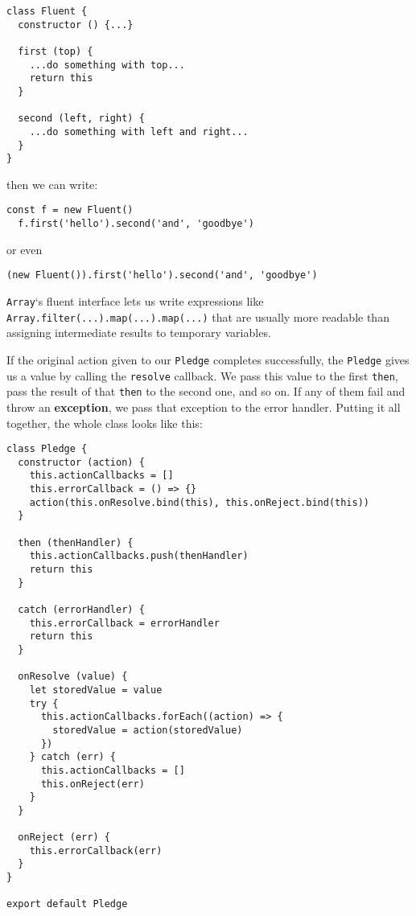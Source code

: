 \documentclass[krantzl]{krantz}
\newcommand{\glossref}[1]{\textbf{#1}}
\begin{document}
\begin{lstlisting}[frame=tblr]
class Fluent {
  constructor () {...}

  first (top) {
    ...do something with top...
    return this
  }

  second (left, right) {
    ...do something with left and right...
  }
}
\end{lstlisting}


\noindent then we can write:

\begin{lstlisting}[frame=tblr]
  const f = new Fluent()
  f.first('hello').second('and', 'goodbye')
\end{lstlisting}


\noindent or even

\begin{lstlisting}[frame=tblr]
  (new Fluent()).first('hello').second('and', 'goodbye')
\end{lstlisting}


\texttt{Array}‘s fluent interface lets us write expressions like
\texttt{Array.filter(...).map(...).map(...)}
that are usually more readable than assigning intermediate results to temporary variables.


If the original action given to our \texttt{Pledge} completes successfully,
the \texttt{Pledge} gives us a value by calling the \texttt{resolve} callback.
We pass this value to the first \texttt{then},
pass the result of that \texttt{then} to the second one,
and so on.
If any of them fail and throw an \glossref{exception},
we pass that exception to the error handler.
Putting it all together,
the whole class looks like this:


\begin{lstlisting}[frame=tblr]
class Pledge {
  constructor (action) {
    this.actionCallbacks = []
    this.errorCallback = () => {}
    action(this.onResolve.bind(this), this.onReject.bind(this))
  }

  then (thenHandler) {
    this.actionCallbacks.push(thenHandler)
    return this
  }

  catch (errorHandler) {
    this.errorCallback = errorHandler
    return this
  }

  onResolve (value) {
    let storedValue = value
    try {
      this.actionCallbacks.forEach((action) => {
        storedValue = action(storedValue)
      })
    } catch (err) {
      this.actionCallbacks = []
      this.onReject(err)
    }
  }

  onReject (err) {
    this.errorCallback(err)
  }
}

export default Pledge
\end{lstlisting}
\end{document}
